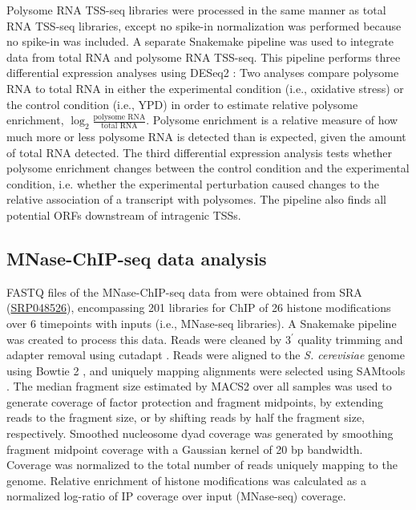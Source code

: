 Polysome RNA TSS-seq libraries were processed in the same manner as total RNA TSS-seq libraries, except no spike-in normalization was performed because no spike-in was included.
A separate Snakemake pipeline was used to integrate data from total RNA and polysome RNA TSS-seq.
This pipeline performs three differential expression analyses using DESeq2 \citep{love2014}: Two analyses compare polysome RNA to total RNA in either the experimental condition (i.e., oxidative stress) or the control condition (i.e., YPD) in order to estimate relative polysome enrichment, $\log_2 \frac{\text{polysome RNA}}{\text{total RNA}}$.
Polysome enrichment is a relative measure of how much more or less polysome RNA is detected than is expected, given the amount of total RNA detected.
The third differential expression analysis tests whether polysome enrichment changes between the control condition and the experimental condition, i.e. whether the experimental perturbation caused changes to the relative association of a transcript with polysomes.
The pipeline also finds all potential ORFs downstream of intragenic TSSs.

\subsection{MNase-ChIP-seq data analysis}

FASTQ files of the MNase-ChIP-seq data from \citet{weiner2015} were obtained from SRA (\href{https://www.ncbi.nlm.nih.gov/sra?term=SRP048526}{SRP048526}), encompassing 201 libraries for ChIP of 26 histone modifications over 6 timepoints with inputs (i.e., MNase-seq libraries).
A Snakemake pipeline was created to process this data.
Reads were cleaned by 3$^\prime$ quality trimming and adapter removal using cutadapt \citep{martin2011}.
Reads were aligned to the \textit{S. cerevisiae} genome using Bowtie 2 \citep{langmead2012}, and uniquely mapping alignments were selected using SAMtools \citep{li2009}.
The median fragment size estimated by MACS2 \citep{zhang2008} over all samples was used to generate coverage of factor protection and fragment midpoints, by extending reads to the fragment size, or by shifting reads by half the fragment size, respectively.
Smoothed nucleosome dyad coverage was generated by smoothing fragment midpoint coverage with a Gaussian kernel of 20 bp bandwidth.
Coverage was normalized to the total number of reads uniquely mapping to the genome.
Relative enrichment of histone modifications was calculated as a normalized log-ratio of IP coverage over input (MNase-seq) coverage.


